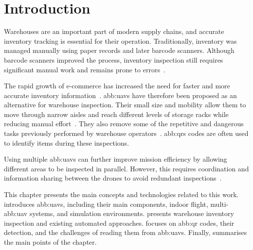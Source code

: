 \section{Introduction}%
\label{sec:bg:intro}

Warehouses are an important part of modern supply chains, and accurate inventory
tracking is essential for their operation. Traditionally, inventory was managed
manually using paper records and later barcode scanners. Although barcode
scanners improved the process, inventory inspection still requires significant
manual work and remains prone to errors~\cite{pore2026drone, pore2026uavqr}.

The rapid growth of e-commerce has increased the need for faster and more
accurate inventory information~\cite{kalinov2020warevision}. \Glspl{abb:uav} have
therefore been proposed as an alternative for warehouse inspection. Their small
size and mobility allow them to move through narrow aisles and reach different
levels of storage racks while reducing manual effort~\cite{pore2026uavqr}. They
also remove some of the repetitive and dangerous tasks previously performed by
warehouse operators~\cite{kalinov2020warevision}. \Glspl{abb:qr} codes are often
used to identify items during these inspections.


Using multiple \glspl{abb:uav} can further improve mission efficiency by allowing
different areas to be inspected in parallel. However, this requires coordination
and information sharing between the drones to avoid redundant
inspections~\cite{pore2026uavqr}.

This chapter presents the main concepts and technologies related to this work.
 introduces \glspl{abb:uav}, including their main components,
indoor flight, multi-\gls{abb:uav} systems, and simulation environments.
 presents warehouse inventory inspection and existing
automated approaches.  focuses on \gls{abb:qr} codes, their
detection, and the challenges of reading them from \glspl{abb:uav}. Finally,
 summarises the main points of the chapter.
